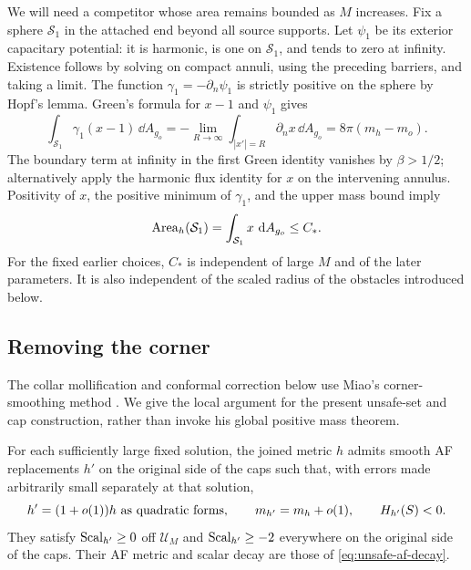 We will need a competitor whose area remains bounded as \(M\)
increases.  Fix a sphere \(\mathcal S_1\) in the attached end
beyond all source supports.  Let \(\psi_1\) be its exterior
capacitary potential: it is harmonic, is one on \(\mathcal S_1\),
and tends to zero at infinity.  Existence follows by solving on
compact annuli, using the preceding barriers, and taking a limit.
The function \(\gamma_1=-\partial_n\psi_1\) is strictly positive
on the sphere by Hopf's lemma.  Green's formula for \(x-1\) and
\(\psi_1\) gives
\begin{equation}
 \int_{\mathcal S_1}\gamma_1(x-1)\,\dd A_{g_o}
       =-\lim_{R\to\infty}\int_{|x'|=R}\partial_nx\,\dd A_{g_o}
       =8\pi(m_h-m_o).
 \label{eq:unsafe-capacity-comparator}
\end{equation}
The boundary term at infinity in the first Green identity vanishes
by \(\beta>1/2\); alternatively apply the harmonic flux identity
for \(x\) on the intervening annulus.  Positivity of \(x\), the
positive minimum of \(\gamma_1\), and the upper mass bound imply
\begin{equation}
 \operatorname{Area}_h(\mathcal S_1)
       =\int_{\mathcal S_1}x\,\mathop{}\!\mathrm d A_{g_o}\le C_*.
 \label{eq:unsafe-comparator-bound}
\end{equation}
For the fixed earlier choices, \(C_*\) is independent of large
\(M\) and of the later parameters.  It is also independent of
the scaled radius of the obstacles introduced below.

\subsection{Removing the corner}

The collar mollification and conformal correction below use Miao's
corner-smoothing method \cite{Miao2002}. We give the local argument for
the present unsafe-set and cap construction, rather than invoke his
global positive mass theorem.

\begin{lemma}
\label{lem:corner-smoothing}
For each sufficiently large fixed solution, the joined metric \(h\)
admits smooth AF replacements \(h'\) on the original side of the
caps such that, with errors made arbitrarily small separately at
that solution,
\begin{equation}
 h'=(1+o(1))h\ \hbox{as quadratic forms},\qquad
 m_{h'}=m_h+o(1),\qquad H_{h'}(S)<0.
 \label{eq:unsafe-smoothing-estimates}
\end{equation}
They satisfy \(\operatorname{Scal}_{h'}\ge0\) off \(\mathcal U_M\) and
\(\operatorname{Scal}_{h'}\ge-2\) everywhere on the original side of the
caps.  Their AF metric and scalar decay are those of
\eqref{eq:unsafe-af-decay}.
\end{lemma}

